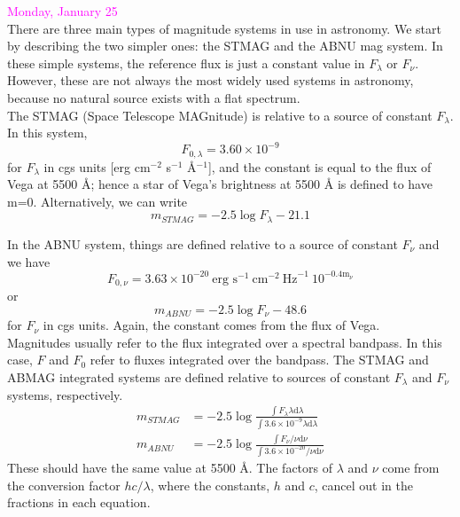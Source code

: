 \documentclass[12pt]{article}
\begin{document}
\noindent \textcolor{magenta}{Monday, January 25}\\

\noindent There are three main types of magnitude systems in use in astronomy.
We start by describing the two simpler ones: the STMAG and the ABNU mag system.
In these simple systems, the reference flux is just a constant value in
$F_{\lambda}$ or $F_{\nu}$. However, these are not always the most widely used
systems in astronomy, because no natural source exists with a flat spectrum.\\

\noindent The STMAG (Space Telescope MAGnitude) is relative to a source of
constant $F_{\lambda}$. In this system,
\begin{equation*}
    F_{0,\lambda} = 3.60 \times 10^{-9}
\end{equation*}
for $F_{\lambda}$ in cgs units
[erg cm$^{-2}$ s$^{-1}$ \AA{}$^{-1}$], and the constant is equal to
the flux of Vega at
5500 \AA{}; hence a star of Vega's brightness at 5500 \AA{} is defined to
have m=0. Alternatively, we can write
\begin{equation*}
    m_{STMAG} = -2.5 \log F_{\lambda} - 21.1
\end{equation*}

\noindent In the ABNU system, things are defined relative to a source
of constant $F_{\nu}$ and we have
\begin{equation*}
    F_{0,\nu} = 3.63 \times 10^{-20}\ \textrm{erg\ s}^{-1}\
    \textrm{cm}^{-2}\ \textrm{Hz}^{-1}\ 10^{-0.4 \textrm{m}_{\nu}}
\end{equation*}
or
\begin{equation*}
    m_{ABNU} = -2.5 \log F_{\nu} - 48.6
\end{equation*}
for $F_{\nu}$ in cgs units. Again, the constant comes from the flux of
Vega.\\

\noindent Magnitudes usually refer to the flux integrated over a
spectral bandpass. In this case, $F$ and $F_0$ refer to fluxes
integrated over the bandpass. The STMAG and ABMAG integrated systems
are defined relative to sources of constant $F_{\lambda}$ and
$F_{\nu}$ systems, respectively.
\begin{align*}
    m_{STMAG} &= -2.5 \log \frac{\int F_{\lambda} \lambda
    \textrm{d}\lambda}{\int3.6\times10^{-9}\lambda\textrm{d}\lambda}\\
    m_{ABNU} &= -2.5 \log \frac{\int F_{\nu}/ \nu
    \textrm{d}\nu}{\int 3.6 \times 10^{-20}/ \nu\textrm{d}\nu}
\end{align*}
These should have the same value at 5500 \AA{}.
The factors of $\lambda$ and $\nu$ come from the conversion factor
$hc/\lambda$, where the constants, $h$ and $c$, cancel out in the
fractions in each equation.\\
\end{document}
